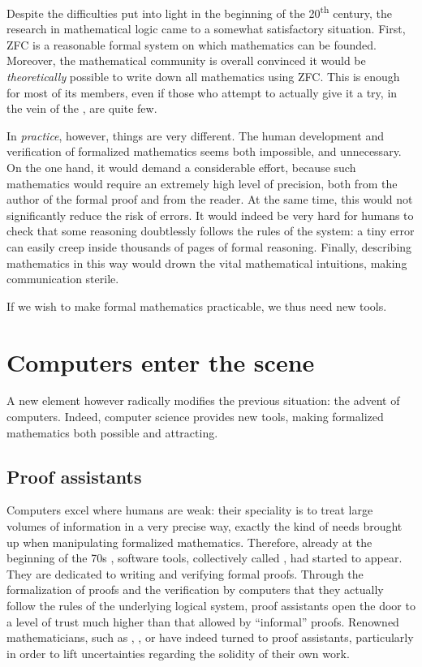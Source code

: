 Despite the difficulties put into light in the beginning of the 20\textsuperscript{th}
century, the research in mathematical logic came to a somewhat satisfactory situation.
First, ZFC is a reasonable formal system on which mathematics can be founded. Moreover,
the mathematical community is overall convinced it would be \emph{theoretically} possible
to write down all mathematics using ZFC. This is enough for most of its members,
even if those who attempt to actually give it a try, in the vein of the
, are quite few.

In \emph{practice}, however, things are very different. The human development and
verification of formalized mathematics%
seems both impossible, and unnecessary.
On the one hand, it would demand a considerable effort, because such mathematics would
require an extremely high level of precision, both from the author of the formal proof
and from the reader. At the same time, this would not significantly reduce the risk of
errors. It would indeed be very hard for humans to check that some reasoning doubtlessly
follows the rules of the system: a tiny error can easily creep inside thousands of pages
of formal reasoning. Finally, describing mathematics in this way would drown the vital
mathematical intuitions, making communication sterile.

If we wish to make formal mathematics practicable, we thus need new tools.

\section{Computers enter the scene}
\label{sec:proof-assistants}

A new element however radically modifies the previous situation: the advent of computers.
Indeed, computer science provides new tools, making formalized mathematics both possible
and attracting.

\subsection{Proof assistants}

Computers excel where humans are weak: their speciality is to treat large volumes of
information in a very precise way, exactly the kind of needs brought up when manipulating
formalized mathematics. Therefore, already at the beginning of the 70s%
%
%
,
software tools, collectively called , had started to
appear. They are dedicated to writing and verifying formal proofs.
Through the formalization of proofs and the verification by computers that they
actually follow the rules of the underlying logical system, proof assistants open the
door to a level of trust much higher than that allowed by “informal” proofs.
Renowned mathematicians, such as ,
, or  have indeed
turned to proof assistants, particularly in order to lift uncertainties regarding the
solidity of their own work.

